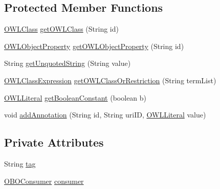 \subsection*{Protected Member Functions}
\begin{DoxyCompactItemize}
\item 
\hyperlink{interfaceorg_1_1semanticweb_1_1owlapi_1_1model_1_1_o_w_l_class}{O\-W\-L\-Class} \hyperlink{classorg_1_1coode_1_1owlapi_1_1obo_1_1parser_1_1_abstract_tag_value_handler_ac3b916ce223d2f4b341d6688980503d2}{get\-O\-W\-L\-Class} (String id)
\item 
\hyperlink{interfaceorg_1_1semanticweb_1_1owlapi_1_1model_1_1_o_w_l_object_property}{O\-W\-L\-Object\-Property} \hyperlink{classorg_1_1coode_1_1owlapi_1_1obo_1_1parser_1_1_abstract_tag_value_handler_a8da8e71805431e51fc2ff021732f84d3}{get\-O\-W\-L\-Object\-Property} (String id)
\item 
String \hyperlink{classorg_1_1coode_1_1owlapi_1_1obo_1_1parser_1_1_abstract_tag_value_handler_a593a10c0f6fb178112489155acff3b94}{get\-Unquoted\-String} (String value)
\item 
\hyperlink{interfaceorg_1_1semanticweb_1_1owlapi_1_1model_1_1_o_w_l_class_expression}{O\-W\-L\-Class\-Expression} \hyperlink{classorg_1_1coode_1_1owlapi_1_1obo_1_1parser_1_1_abstract_tag_value_handler_a29f46163ce39bdc49197b7ddf0ff9da2}{get\-O\-W\-L\-Class\-Or\-Restriction} (String term\-List)
\item 
\hyperlink{interfaceorg_1_1semanticweb_1_1owlapi_1_1model_1_1_o_w_l_literal}{O\-W\-L\-Literal} \hyperlink{classorg_1_1coode_1_1owlapi_1_1obo_1_1parser_1_1_abstract_tag_value_handler_abcecbb47a356b147ac60705a98c614c5}{get\-Boolean\-Constant} (boolean b)
\item 
void \hyperlink{classorg_1_1coode_1_1owlapi_1_1obo_1_1parser_1_1_abstract_tag_value_handler_a79f925f75c125df760255f8c2b3a0616}{add\-Annotation} (String id, String uri\-I\-D, \hyperlink{interfaceorg_1_1semanticweb_1_1owlapi_1_1model_1_1_o_w_l_literal}{O\-W\-L\-Literal} value)
\end{DoxyCompactItemize}
\subsection*{Private Attributes}
\begin{DoxyCompactItemize}
\item 
String \hyperlink{classorg_1_1coode_1_1owlapi_1_1obo_1_1parser_1_1_abstract_tag_value_handler_af9d0866392b74b57ec524c6ae0f6e7be}{tag}
\item 
\hyperlink{classorg_1_1coode_1_1owlapi_1_1obo_1_1parser_1_1_o_b_o_consumer}{O\-B\-O\-Consumer} \hyperlink{classorg_1_1coode_1_1owlapi_1_1obo_1_1parser_1_1_abstract_tag_value_handler_ab27f1ff22d15640c5f81585f18265137}{consumer}
\end{DoxyCompactItemize}


